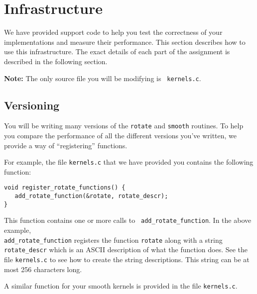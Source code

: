 \documentclass[11pt]{article}
\begin{document}
\section{Infrastructure}
We have provided support code to help you test the correctness of your
implementations and measure their performance. This section describes
how to use this infrastructure. The exact details of each part of the
assignment is described in the following section.

{\bf Note:} The only source file you will be modifying is {\tt
kernels.c}.

\subsection*{Versioning}
You will be writing many versions of the {\tt rotate} and {\tt smooth}
routines. To help you compare the performance of all the different
versions you've written, we provide a way of ``registering''
functions. 

For example, the file {\tt kernels.c} that we have provided you 
contains the following function:
\small{\begin{verbatim}
void register_rotate_functions() {
   add_rotate_function(&rotate, rotate_descr);
}
\end{verbatim}}
This function contains one or more calls to {\tt
add\_rotate\_function}. In the above example, \\
{\tt add\_rotate\_function}
registers the function {\tt rotate} along with a string {\tt
rotate\_descr} which is an ASCII description of what the function does.
See the file {\tt kernels.c} to see how to create the string
descriptions. This string can be at most 256 characters long.

A similar function for your smooth kernels 
is provided in the file {\tt kernels.c}.
\end{document}
